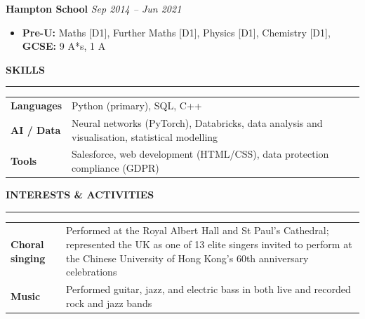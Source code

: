 \documentclass[11pt, a4paper]{article}
\newcommand{\cvsection}[1]{%
  \vspace{7pt}%
  {\small\bfseries\color{navy}\MakeUppercase{#1}}\par%
  \nopagebreak\vspace{-8pt}%
  {\color{navy}\rule{\linewidth}{0.4pt}}\par%
  \vspace{3pt}%
}
\newcommand{\jobheader}[3]{%
  \vspace{4pt}%
  \noindent\textbf{#1}%
  \ifx\relax#2\relax\else{\color{mygray}\ \ |\ \ #2}\fi%
  \hfill{\color{mygray}\small\textit{#3}}\par%
  \vspace{1pt}%
}
\begin{document}
\jobheader{Hampton School}{}{Sep 2014 -- Jun 2021}
\begin{itemize}
  \item \textbf{Pre-U:} Maths [D1], Further Maths [D1], Physics [D1], Chemistry [D1], \textbf{GCSE:} 9 A*s, 1 A \\
\end{itemize}

\cvsection{Skills}

\vspace{1pt}
\begin{tabularx}{\textwidth}{@{}lX@{}}
  \textbf{Languages}  & Python (primary), SQL, C++ \\[2pt]
  \textbf{AI / Data}  & Neural networks (PyTorch), Databricks, data analysis and visualisation, statistical modelling \\[2pt]
  \textbf{Tools}      & Salesforce, web development (HTML/CSS), data protection compliance (GDPR) \\
\end{tabularx}

\cvsection{Interests \& Activities}

\vspace{1pt}
\begin{tabularx}{\textwidth}{@{}lX@{}}
  \textbf{Choral singing} & Performed at the Royal Albert Hall and St Paul's Cathedral;
                            represented the UK as one of 13 elite singers invited to perform
                            at the Chinese University of Hong Kong's 60th anniversary
                            celebrations \\
  \textbf{Music}          & Performed guitar, jazz, and electric bass in both live and recorded rock and jazz bands \\
\end{tabularx}
\end{document}
